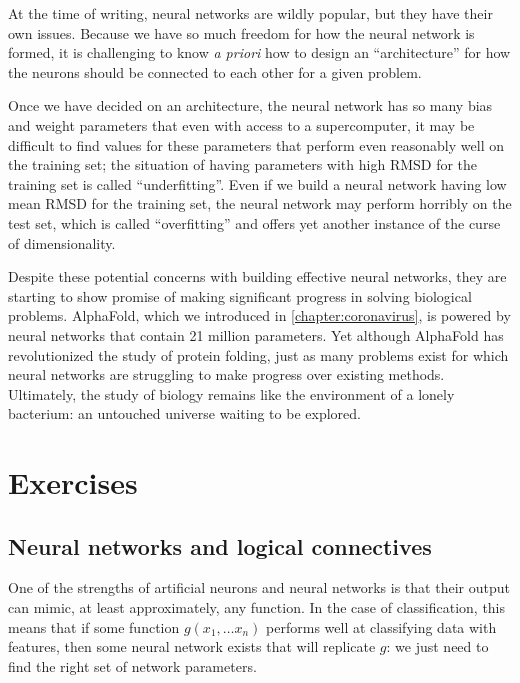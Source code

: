 At the time of writing, neural networks are wildly popular, but they have their own issues. Because we have so much freedom for how the neural network is formed, it is challenging to know \textit{a priori} how to design an ``architecture'' for how the neurons should be connected to each other for a given problem.

Once we have decided on an architecture, the neural network has so many bias and weight parameters that even with access to a supercomputer, it may be difficult to find values for these parameters that perform even reasonably well on the training set; the situation of having parameters with high RMSD for the training set is called ``underfitting''. Even if we build a neural network having low mean RMSD for the training set, the neural network may perform horribly on the test set, which is called ``overfitting'' and offers yet another instance of the curse of dimensionality.

Despite these potential concerns with building effective neural networks, they are starting to show promise of making significant progress in solving biological problems. AlphaFold, which we introduced in \autoref{chapter:coronavirus}, is powered by neural networks that contain 21 million parameters.  Yet although AlphaFold has revolutionized the study of protein folding, just as many problems exist for which neural networks are struggling to make progress over existing methods. Ultimately, the study of biology  remains like the environment of a lonely bacterium: an untouched universe waiting to be explored.

\FloatBarrier

\newpage
{}
\section{Exercises}

\subsection{Neural networks and logical connectives}

One of the strengths of artificial neurons and neural networks is that their output can mimic, at least approximately, any function. In the case of classification, this means that if some function $g(x_1, \ldots x_n)$ performs well at classifying data with  features, then some neural network exists that will replicate $g$: we just need to find the right set of network parameters.

